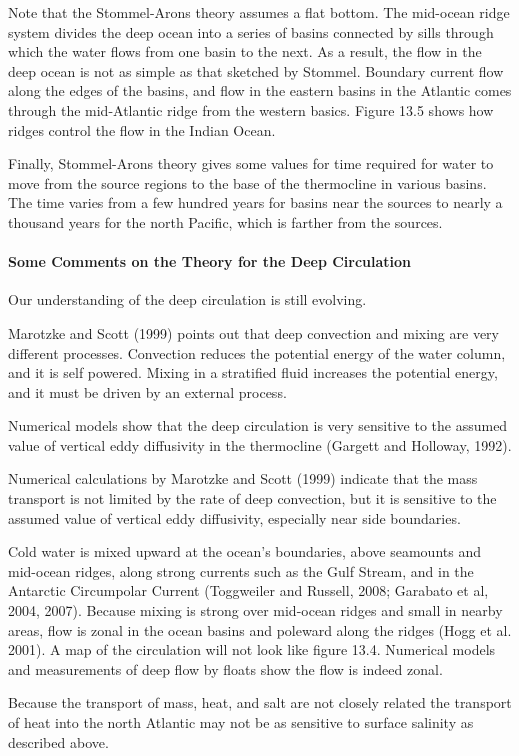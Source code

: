 Note that the Stommel-Arons theory assumes a flat bottom. The mid-ocean ridge system divides the deep ocean into a series of basins connected by sills through which the water flows from one basin to the next. As a result, the flow in the deep ocean is not as simple as that sketched by Stommel. Boundary
current flow along the edges of the basins, and flow in the eastern basins in the Atlantic comes through the mid-Atlantic ridge from the western basics. Figure 13.5 shows how ridges control the flow in the Indian Ocean.

Finally, Stommel-Arons theory gives some values for time required for water to move from the source regions to the base of the thermocline in various basins. The time varies from a few hundred years for basins near the sources to nearly a thousand years for the north Pacific, which is farther from the sources.

\paragraph{Some Comments on the Theory for the Deep Circulation} Our understanding of the deep circulation is still evolving.
\begin{enumerate}
\vitem  Marotzke and Scott (1999) points out that deep convection and mixing are very different processes. Convection reduces the potential energy of the water column, and it is self powered. Mixing in a stratified fluid increases the potential energy, and it must be driven by an external process. 

\vitem Numerical models show that the deep circulation is very sensitive to the assumed value of vertical eddy diffusivity in the thermocline (Gargett and Holloway, 1992). 

\vitem Numerical calculations by Marotzke and Scott (1999) indicate that the mass transport is not limited by the rate of deep convection, but it is sensitive to the assumed value of vertical eddy diffusivity, especially near side boundaries.

\vitem Cold water is mixed upward at the ocean's boundaries, above seamounts  and mid-ocean ridges, along strong currents such as the Gulf Stream, and in the Antarctic Circumpolar Current (Toggweiler and Russell, 2008; Garabato et al, 2004, 2007). Because mixing is strong over mid-ocean ridges and small in nearby areas, flow is zonal in the ocean basins and poleward along the ridges (Hogg et al. 2001). A map of the circulation will not look like figure 13.4. Numerical models and measurements of deep flow by floats show the flow is indeed zonal.

\vitem Because the transport of mass, heat, and salt are not closely related the transport of heat into the north Atlantic may not be as sensitive to surface salinity as described above.
\end{enumerate}

